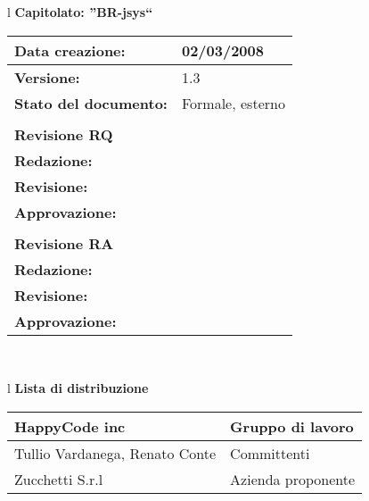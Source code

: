 

\newcommand{\lv}{ 1.3 } %
\newcommand{\dt}{ Test Report }%


\begin{center}
\thispagestyle{plain}
\begin{table}[htbp]
\large{
\begin{tabular}{l}
\Large{\textbf{\textsf{Capitolato: ''BR-jsys``}}} \\
\begin{tabular}{|p{6cm}|p{6cm}|}
\hline
\textbf{Data creazione:} & 02/03/2008 \\ \hline
\textbf{Versione:} & \lv \\ \hline
\textbf{Stato del documento:} & Formale, esterno \\ \hline
& \\ \hline
\textbf{Revisione RQ} & \\ \hline
\textbf{Redazione:} & \MT \\ \hline
\textbf{Revisione:} & \MB \\ \hline
\textbf{Approvazione:}  & \AT  \\ \hline
& \\ \hline
\textbf{Revisione RA} & \\ \hline
\textbf{Redazione:} & \ET \\ \hline
\textbf{Revisione:} & \AT \\ \hline
\textbf{Approvazione:}  & \MT  \\ \hline
\end{tabular} \\
\end{tabular}
}
\end{table}

\begin{table}[hbtp]
\large{
\begin{tabular}{l}
\Large{\textbf{\textsf{Lista di distribuzione}}} \\
\begin{tabular}{|p{6cm}|p{6cm}|} \hline
{HappyCode inc}& Gruppo di lavoro \\ \hline
{Tullio Vardanega, Renato Conte}& Committenti \\ \hline 
{Zucchetti S.r.l}& Azienda proponente\\ \hline
\end{tabular} \\
\end{tabular}
}
\end{table}
\begin{table}[hbtp]


\end{table}
\end{center}
